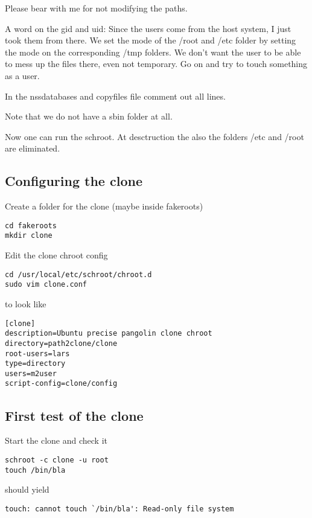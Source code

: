\documentclass[a4paper]{book}
\begin{document}
Please bear with me for not modifying the paths.

A word on the gid and uid: Since the users come from the host system, I just
took them from there.  We set the mode of the /root and /etc folder by setting
the mode on the corresponding /tmp folders.  We don't want the user to be able
to mess up the files there, even not temporary. Go on and try to touch
something as a user.

In the nssdatabases and copyfiles file comment out all lines.

Note that we do not have a sbin folder at all.

Now one can run the schroot. At desctruction the also the folders /etc and
/root are eliminated.

\subsection{Configuring the clone}

Create a folder for the clone (maybe inside fakeroots)

\begin{verbatim}
cd fakeroots
mkdir clone
\end{verbatim}

Edit the clone chroot config

\begin{verbatim}
cd /usr/local/etc/schroot/chroot.d
sudo vim clone.conf
\end{verbatim}

to look like

\begin{verbatim}
[clone]
description=Ubuntu precise pangolin clone chroot
directory=path2clone/clone
root-users=lars
type=directory
users=m2user
script-config=clone/config
\end{verbatim}

\subsection{First test of the clone}

Start the clone and check it

\begin{verbatim}
schroot -c clone -u root
touch /bin/bla
\end{verbatim}

should yield

\begin{verbatim}
touch: cannot touch `/bin/bla': Read-only file system
\end{verbatim}
\end{document}
